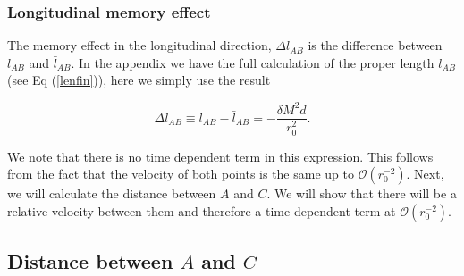\documentclass[aps,showpacs,onecolumn,floats,prd,superscriptaddress,nofootinbib]{revtex4-1}
\begin{document}
\subsubsection{Longitudinal memory effect}

The memory effect in the longitudinal direction, $\Delta l_{AB}$ is the difference between $l_{AB}$ and $\bar{l}_{AB}$. In the appendix we have the full calculation of the proper length $l_{AB}$ (see Eq (\ref{lenfin})), here we simply use the result

\begin{equation}
	\Delta l_{AB} \equiv l_{AB} - \bar{l}_{AB} = - \frac{\delta M^2 d}{r_0^2}.
\end{equation}

We note that there is no time dependent term in this expression. This follows from the fact that the velocity of both points is the same up to $\mathcal{O}(r_0^{-2})$.
Next, we will calculate the distance between $A$ and $C$. We will show that there will be a relative velocity between them and therefore a time dependent term at $\mathcal{O}(r_0^{-2})$. 

\subsection{Distance between $A$ and $C$}
\end{document}
